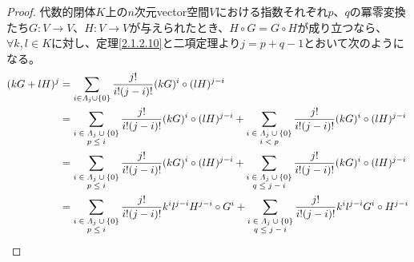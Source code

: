 \documentclass[dvipdfmx]{jsarticle}
\begin{document}
\begin{proof}
代数的閉体$K$上の$n$次元vector空間$V$における指数それぞれ$p$、$q$の冪零変換たち$G:V \rightarrow V$、$H:V \rightarrow V$が与えられたとき、$H \circ G = G \circ H$が成り立つなら、$\forall k,l \in K$に対し、定理\ref{2.1.2.10}と二項定理より$j = p + q - 1$とおいて次のようになる。
\begin{align*}
(kG + lH)^{j} &= \sum_{i \in \varLambda_{j} \cup \left\{ 0 \right\}} {\frac{j!}{i!(j - i)!}(kG)^{i} \circ (lH)^{j - i}} \\
&= \sum_{\scriptsize \begin{matrix} i \in \varLambda_{j} \cup \left\{ 0 \right\} \\p \leq i \\\end{matrix}} {\frac{j!}{i!(j - i)!}(kG)^{i} \circ (lH)^{j - i}} + \sum_{\scriptsize \begin{matrix} i \in \varLambda_{j} \cup \left\{ 0 \right\} \\i < p \\\end{matrix}} {\frac{j!}{i!(j - i)!}(kG)^{i} \circ (lH)^{j - i}} \\
&= \sum_{\scriptsize \begin{matrix} i \in \varLambda_{j} \cup \left\{ 0 \right\} \\p \leq i \\\end{matrix}} {\frac{j!}{i!(j - i)!}(kG)^{i} \circ (lH)^{j - i}} + \sum_{\scriptsize \begin{matrix} i \in \varLambda_{j} \cup \left\{ 0 \right\} \\q \leq j - i \\\end{matrix}} {\frac{j!}{i!(j - i)!}(kG)^{i} \circ (lH)^{j - i}} \\
&= \sum_{\scriptsize \begin{matrix} i \in \varLambda_{j} \cup \left\{ 0 \right\} \\p \leq i \\\end{matrix}} {\frac{j!}{i!(j - i)!}k^{i}l^{j - i}H^{j - i} \circ G^{i}} + \sum_{\scriptsize \begin{matrix} i \in \varLambda_{j} \cup \left\{ 0 \right\} \\q \leq j - i \\\end{matrix}} {\frac{j!}{i!(j - i)!}k^{i}l^{j - i}G^{i} \circ H^{j - i}} \\

\end{align*}
\end{proof}
\end{document}
